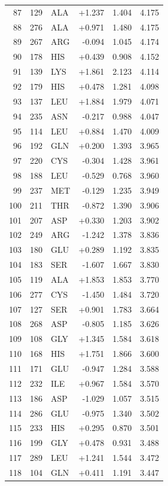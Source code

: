 \begin{longtable}{r l l r r r}
87 & 129 & ALA & +1.237 & 1.404 & 4.175 \\
88 & 276 & ALA & +0.971 & 1.480 & 4.175 \\
89 & 267 & ARG & -0.094 & 1.045 & 4.174 \\
90 & 178 & HIS & +0.439 & 0.908 & 4.152 \\
91 & 139 & LYS & +1.861 & 2.123 & 4.114 \\
92 & 179 & HIS & +0.478 & 1.281 & 4.098 \\
93 & 137 & LEU & +1.884 & 1.979 & 4.071 \\
94 & 235 & ASN & -0.217 & 0.988 & 4.047 \\
95 & 114 & LEU & +0.884 & 1.470 & 4.009 \\
96 & 192 & GLN & +0.200 & 1.393 & 3.965 \\
97 & 220 & CYS & -0.304 & 1.428 & 3.961 \\
98 & 188 & LEU & -0.529 & 0.768 & 3.960 \\
99 & 237 & MET & -0.129 & 1.235 & 3.949 \\
100 & 211 & THR & -0.872 & 1.390 & 3.906 \\
101 & 207 & ASP & +0.330 & 1.203 & 3.902 \\
102 & 249 & ARG & -1.242 & 1.378 & 3.836 \\
103 & 180 & GLU & +0.289 & 1.192 & 3.835 \\
104 & 183 & SER & -1.607 & 1.667 & 3.830 \\
105 & 119 & ALA & +1.853 & 1.853 & 3.770 \\
106 & 277 & CYS & -1.450 & 1.484 & 3.720 \\
107 & 127 & SER & +0.901 & 1.783 & 3.664 \\
108 & 268 & ASP & -0.805 & 1.185 & 3.626 \\
109 & 108 & GLY & +1.345 & 1.584 & 3.618 \\
110 & 168 & HIS & +1.751 & 1.866 & 3.600 \\
111 & 171 & GLU & -0.947 & 1.284 & 3.588 \\
112 & 232 & ILE & +0.967 & 1.584 & 3.570 \\
113 & 186 & ASP & -1.029 & 1.057 & 3.515 \\
114 & 286 & GLU & -0.975 & 1.340 & 3.502 \\
115 & 233 & HIS & +0.295 & 0.870 & 3.501 \\
116 & 199 & GLY & +0.478 & 0.931 & 3.488 \\
117 & 289 & LEU & +1.241 & 1.544 & 3.472 \\
118 & 104 & GLN & +0.411 & 1.191 & 3.447 \\

\end{longtable}
